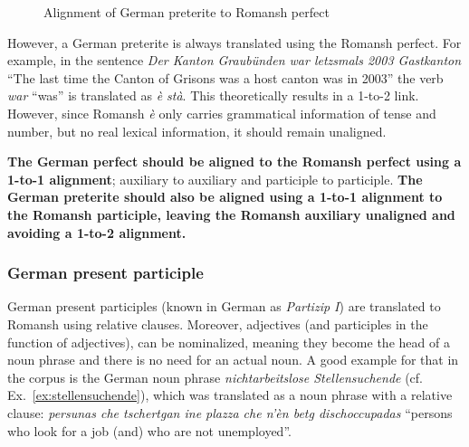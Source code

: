 \begin{figure}
\centering
{}       

\vspace*{1cm}

             
\caption{Alignment of German preterite to Romansh perfect}
\label{fig:pret-perf}
\end{figure}

However, a German preterite is always translated using the Romansh perfect. 
For example, in the sentence \emph{Der Kanton Graubünden war letzsmals 2003 Gastkanton} \enquote{The last time the Canton of Grisons was a host canton was in 2003} the verb \emph{war} \enquote{was} is translated as \emph{è stà}. 
This theoretically results in a 1-to-2 link. 
However, since Romansh \emph{è} only carries grammatical information of tense and number, but no real lexical information, it should remain unaligned. 

\textbf{The German perfect should be aligned to the Romansh perfect using a 1-to-1 alignment}; auxiliary to auxiliary and participle to participle. 
\textbf{The German preterite should also be aligned using a 1-to-1 alignment to the Romansh participle, leaving the Romansh auxiliary unaligned and avoiding a 1-to-2 alignment.}

\subsubsection{German present participle}
German present participles (known in German as \emph{Partizip I}) are translated to Romansh using relative clauses. Moreover, adjectives (and participles in the function of adjectives), can be nominalized, meaning they become the head of a noun phrase and there is no need for an actual noun. 
A good example for that in the corpus is the German noun phrase \emph{nichtarbeitslose Stellensuchende} (cf. Ex.~\ref{ex:stellensuchende}), which was translated as a noun phrase with a relative clause: \emph{persunas che tschertgan ine plazza che n'èn betg dischoccupadas} \enquote{persons who look for a job (and) who are not unemployed}.


